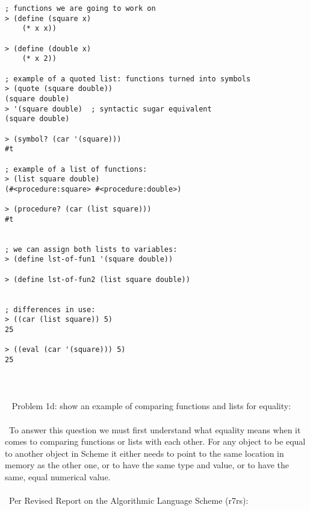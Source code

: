 \documentclass{article}
\begin{document}
\begin{verbatim} 
; functions we are going to work on
> (define (square x)
    (* x x))

> (define (double x)
    (* x 2))

; example of a quoted list: functions turned into symbols
> (quote (square double))
(square double)
> '(square double)	; syntactic sugar equivalent
(square double)

> (symbol? (car '(square)))
#t

; example of a list of functions:
> (list square double)
(#<procedure:square> #<procedure:double>)

> (procedure? (car (list square)))
#t


; we can assign both lists to variables: 
> (define lst-of-fun1 '(square double))

> (define lst-of-fun2 (list square double))


; differences in use:
> ((car (list square)) 5)
25

> ((eval (car '(square))) 5)
25
\end{verbatim}

\paragraph{}\
\paragraph{}\
\rmfamily
Problem 1d: show an example of comparing functions and lists for equality:
\paragraph{}\
To answer this question we must first understand what equality means when it comes to comparing functions or lists with each other. For any object to be equal to another object in Scheme it either needs to point to the same location in memory as the other one, or to have the same type and value, or to have the same, equal numerical value. 

\paragraph{}\
Per Revised Report on the Algorithmic Language Scheme (r7rs):
\end{document}
